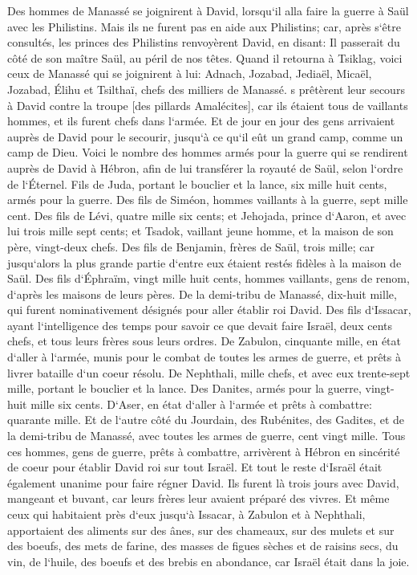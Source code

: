 \verse Des hommes de Manassé se joignirent à David, lorsqu`il alla faire la guerre à Saül avec les Philistins. Mais ils ne furent pas en aide aux Philistins; car, après s`être consultés, les princes des Philistins renvoyèrent David, en disant: Il passerait du côté de son maître Saül, au péril de nos têtes. 
\verse Quand il retourna à Tsiklag, voici ceux de Manassé qui se joignirent à lui: Adnach, Jozabad, Jediaël, Micaël, Jozabad, Élihu et Tsilthaï, chefs des milliers de Manassé. 
\verse s prêtèrent leur secours à David contre la troupe [des pillards Amalécites], car ils étaient tous de vaillants hommes, et ils furent chefs dans l`armée. 
\verse Et de jour en jour des gens arrivaient auprès de David pour le secourir, jusqu`à ce qu`il eût un grand camp, comme un camp de Dieu. 
\verse Voici le nombre des hommes armés pour la guerre qui se rendirent auprès de David à Hébron, afin de lui transférer la royauté de Saül, selon l`ordre de l`Éternel. 
\verse Fils de Juda, portant le bouclier et la lance, six mille huit cents, armés pour la guerre. 
\verse Des fils de Siméon, hommes vaillants à la guerre, sept mille cent. 
\verse Des fils de Lévi, quatre mille six cents; 
\verse et Jehojada, prince d`Aaron, et avec lui trois mille sept cents; 
\verse et Tsadok, vaillant jeune homme, et la maison de son père, vingt-deux chefs. 
\verse Des fils de Benjamin, frères de Saül, trois mille; car jusqu`alors la plus grande partie d`entre eux étaient restés fidèles à la maison de Saül. 
\verse Des fils d`Éphraïm, vingt mille huit cents, hommes vaillants, gens de renom, d`après les maisons de leurs pères. 
\verse De la demi-tribu de Manassé, dix-huit mille, qui furent nominativement désignés pour aller établir roi David. 
\verse Des fils d`Issacar, ayant l`intelligence des temps pour savoir ce que devait faire Israël, deux cents chefs, et tous leurs frères sous leurs ordres. 
\verse De Zabulon, cinquante mille, en état d`aller à l`armée, munis pour le combat de toutes les armes de guerre, et prêts à livrer bataille d`un coeur résolu. 
\verse De Nephthali, mille chefs, et avec eux trente-sept mille, portant le bouclier et la lance. 
\verse Des Danites, armés pour la guerre, vingt-huit mille six cents. 
\verse D`Aser, en état d`aller à l`armée et prêts à combattre: quarante mille. 
\verse Et de l`autre côté du Jourdain, des Rubénites, des Gadites, et de la demi-tribu de Manassé, avec toutes les armes de guerre, cent vingt mille. 
\verse Tous ces hommes, gens de guerre, prêts à combattre, arrivèrent à Hébron en sincérité de coeur pour établir David roi sur tout Israël. Et tout le reste d`Israël était également unanime pour faire régner David. 
\verse Ils furent là trois jours avec David, mangeant et buvant, car leurs frères leur avaient préparé des vivres. 
\verse Et même ceux qui habitaient près d`eux jusqu`à Issacar, à Zabulon et à Nephthali, apportaient des aliments sur des ânes, sur des chameaux, sur des mulets et sur des boeufs, des mets de farine, des masses de figues sèches et de raisins secs, du vin, de l`huile, des boeufs et des brebis en abondance, car Israël était dans la joie. 

